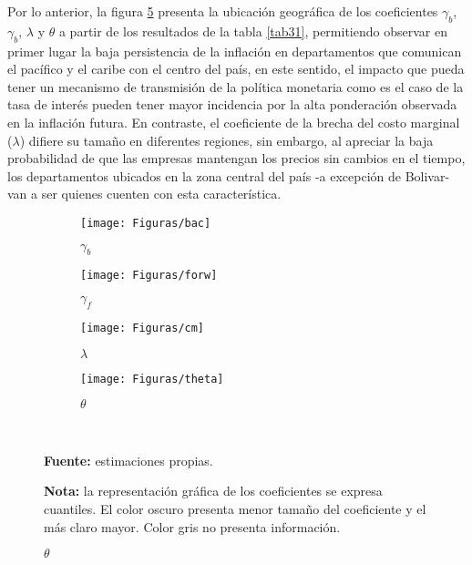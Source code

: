Por lo anterior, la figura \ref{estim} presenta la ubicación geográfica de los coeficientes $\gamma_{b}$, $\gamma_{b}$, $\lambda$ y $\theta$ a partir de los resultados de la tabla \ref{tab31}, permitiendo observar en primer lugar la baja persistencia de la inflación en departamentos que comunican el pacífico y el caribe con el centro del país, en este sentido, el impacto que pueda tener un mecanismo de transmisión de la política monetaria como es el caso de la tasa de interés pueden tener mayor incidencia por la alta ponderación observada en la inflación futura. En contraste, el coeficiente de la brecha del costo marginal ($\lambda$) difiere su tamaño en diferentes regiones, sin embargo, al apreciar la baja probabilidad de que las empresas mantengan los precios sin cambios en el tiempo, los departamentos ubicados en la zona central del país -a excepción de Bolivar- van a ser quienes cuenten con esta característica.


\begin{figure}[H]
\caption{Resultados de estimaciones espaciales}
\begin{subfigure}{0.22\textwidth}
  \centering
	\texttt{[image: Figuras/bac]} 
  \caption{$\gamma_{b}$}
  \label{}
\end{subfigure}
\begin{subfigure}{0.22\textwidth}
  \centering
	\texttt{[image: Figuras/forw]} 
  \caption{$\gamma_{f}$}
  \label{}
\end{subfigure}
\begin{subfigure}{0.22\textwidth}
  \centering
	\texttt{[image: Figuras/cm]} 
  \caption{$\lambda$}
  \label{}
\end{subfigure}
\begin{subfigure}{0.22\textwidth}
  \centering
	\texttt{[image: Figuras/theta]} 
  \caption{$\theta$}
  \label{estimd}
\end{subfigure}\\
  \raggedright  \scriptsize \textbf{Fuente:} estimaciones propias.\\
\raggedright  \scriptsize \textbf{Nota:} la representación gráfica de los coeficientes se expresa  cuantiles. El color oscuro presenta menor tamaño del coeficiente y el más claro mayor. Color gris no presenta información.\\
\label{estim}	
\end{figure}
 
